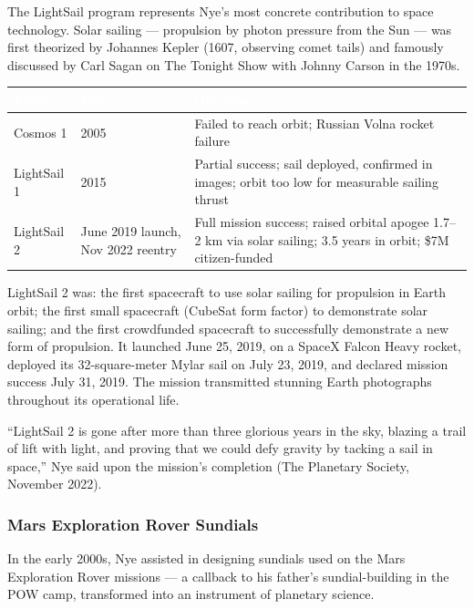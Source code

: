 \documentclass[11pt,letterpaper]{article}
\newcommand{\tableheader}[1]{\textbf{\sffamily\textcolor{white}{#1}}}
\begin{document}
The LightSail program represents Nye's most concrete contribution to space technology. Solar sailing --- propulsion by photon pressure from the Sun --- was first theorized by Johannes Kepler (1607, observing comet tails) and famously discussed by Carl Sagan on The Tonight Show with Johnny Carson in the 1970s.

\begin{center}
\begin{tabularx}{\textwidth}{L{2.5cm}L{2.5cm}X}
\toprule
{}
\tableheader{Mission} & \tableheader{Date} & \tableheader{Outcome} \\
\midrule
Cosmos 1 & 2005 & Failed to reach orbit; Russian Volna rocket failure \\
LightSail 1 & 2015 & Partial success; sail deployed, confirmed in images; orbit too low for measurable sailing thrust \\
LightSail 2 & June 2019 launch, Nov 2022 reentry & Full mission success; raised orbital apogee 1.7--2 km via solar sailing; 3.5 years in orbit; \$7M citizen-funded \\
\bottomrule
\end{tabularx}
\end{center}

LightSail 2 was: the first spacecraft to use solar sailing for propulsion in Earth orbit; the first small spacecraft (CubeSat form factor) to demonstrate solar sailing; and the first crowdfunded spacecraft to successfully demonstrate a new form of propulsion. It launched June 25, 2019, on a SpaceX Falcon Heavy rocket, deployed its 32-square-meter Mylar sail on July 23, 2019, and declared mission success July 31, 2019. The mission transmitted stunning Earth photographs throughout its operational life.

``LightSail 2 is gone after more than three glorious years in the sky, blazing a trail of lift with light, and proving that we could defy gravity by tacking a sail in space,'' Nye said upon the mission's completion (The Planetary Society, November 2022).

\subsubsection{Mars Exploration Rover Sundials}

In the early 2000s, Nye assisted in designing sundials used on the Mars Exploration Rover missions --- a callback to his father's sundial-building in the POW camp, transformed into an instrument of planetary science.
\end{document}
